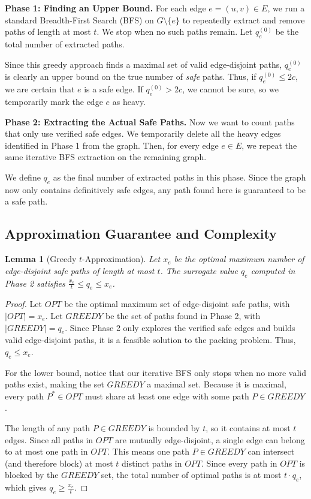 \documentclass[11pt,a4paper]{article}
\newtheorem{lemma}{Lemma}[section]
\begin{document}
\textbf{Phase 1: Finding an Upper Bound.}
For each edge $e = (u,v) \in E$, we run a standard Breadth-First Search (BFS) on $G \setminus \{e\}$ to repeatedly extract and remove paths of length at most $t$. We stop when no such paths remain. Let $q_e^{(0)}$ be the total number of extracted paths. 

Since this greedy approach finds a maximal set of valid edge-disjoint paths, $q_e^{(0)}$ is clearly an upper bound on the true number of \emph{safe} paths. Thus, if $q_e^{(0)} \le 2c$, we are certain that $e$ is a safe edge. If $q_e^{(0)} > 2c$, we cannot be sure, so we temporarily mark the edge $e$ as heavy.

\textbf{Phase 2: Extracting the Actual Safe Paths.}
Now we want to count paths that only use verified safe edges. We temporarily delete all the heavy edges identified in Phase 1 from the graph. Then, for every edge $e \in E$, we repeat the same iterative BFS extraction on the remaining graph. 

We define $q_e$ as the final number of extracted paths in this phase. Since the graph now only contains definitively safe edges, any path found here is guaranteed to be a safe path.

\subsection{Approximation Guarantee and Complexity}
\begin{lemma}[Greedy $t$-Approximation]\label{lem:greedy_approx}
Let $x_e$ be the optimal maximum number of edge-disjoint safe paths of length at most $t$. The surrogate value $q_e$ computed in Phase 2 satisfies $\frac{x_e}{t} \le q_e \le x_e$.
\end{lemma}
\begin{proof}
Let $OPT$ be the optimal maximum set of edge-disjoint safe paths, with $|OPT| = x_e$. Let $GREEDY$ be the set of paths found in Phase 2, with $|GREEDY| = q_e$. Since Phase 2 only explores the verified safe edges and builds valid edge-disjoint paths, it is a feasible solution to the packing problem. Thus, $q_e \le x_e$.

For the lower bound, notice that our iterative BFS only stops when no more valid paths exist, making the set $GREEDY$ a maximal set. Because it is maximal, every path $P^* \in OPT$ must share at least one edge with some path $P \in GREEDY$. 

The length of any path $P \in GREEDY$ is bounded by $t$, so it contains at most $t$ edges. Since all paths in $OPT$ are mutually edge-disjoint, a single edge can belong to at most one path in $OPT$. This means one path $P \in GREEDY$ can intersect (and therefore block) at most $t$ distinct paths in $OPT$. Since every path in $OPT$ is blocked by the $GREEDY$ set, the total number of optimal paths is at most $t \cdot q_e$, which gives $q_e \ge \frac{x_e}{t}$.
\end{proof}
\end{document}
